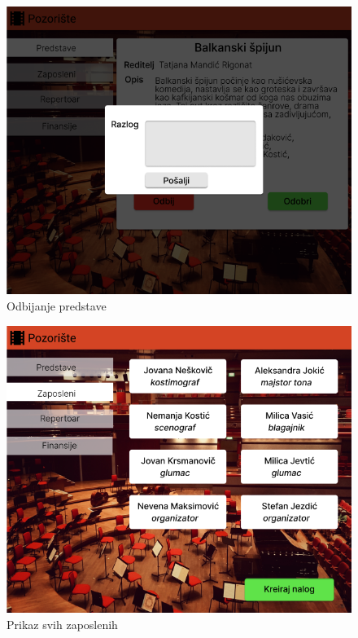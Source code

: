 \documentclass[a4paper]{article}
\begin{document}
\begin{figure}[H]
  \begin{center}
    \includegraphics[width=130mm]{../images/supervizor_odbijanje_predstave.png}
  \end{center}
  \caption{Odbijanje predstave}
  \label{supervizor_odbijanje_predstave}
\end{figure}

\begin{figure}[H]
  \begin{center}
    \includegraphics[width=130mm]{../images/supervizor_zaposleni.png}
  \end{center}
  \caption{Prikaz svih zaposlenih}
  \label{supervizor_zaposleni}
\end{figure}
\end{document}
